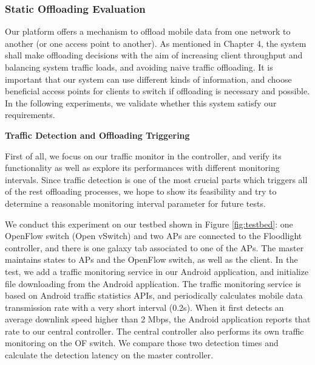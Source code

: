\documentclass[english]{tktltiki}
\begin{document}
\subsubsection{Static Offloading Evaluation}


Our platform offers a mechanism to offload mobile data from one network to another (or one access point to another). As mentioned in Chapter 4, the system shall make offloading decisions with the aim of increasing client throughput and balancing system traffic loads, and avoiding naive traffic offloading. It is important that our system can use different kinds of information, and choose beneficial access points for clients to switch if offloading is necessary and possible. In the following experiments, we validate whether this system satisfy our requirements.


\vspace{1mm}

\textbf{Traffic Detection and Offloading Triggering}

\vspace{1mm}


First of all, we focus on our traffic monitor in the controller, and verify its functionality as well as explore its performances with different monitoring intervals. Since traffic detection is one of the most crucial parts which triggers all of the rest offloading processes, we hope to show its feasibility and try to determine a reasonable monitoring interval parameter for future tests.

We conduct this experiment on our testbed shown in Figure \ref{fig:testbed}: one OpenFlow switch (Open vSwitch) and two APs are connected to the Floodlight controller, and there is one galaxy tab associated to one of the APs. The master maintains states to APs and the OpenFlow switch, as well as the client. In the test, we add a traffic monitoring service in our Android application, and initialize file downloading from the Android application. The traffic monitoring service is based on Android traffic statistics APIs, and periodically calculates mobile data transmission rate with a very short interval (0.2s). When it first detects an average downlink speed higher than 2 Mbps, the Android application reports that rate to our central controller. The central controller also performs its own traffic monitoring on the OF switch. We compare those two detection times and calculate the detection latency on the master controller. 
\end{document}
